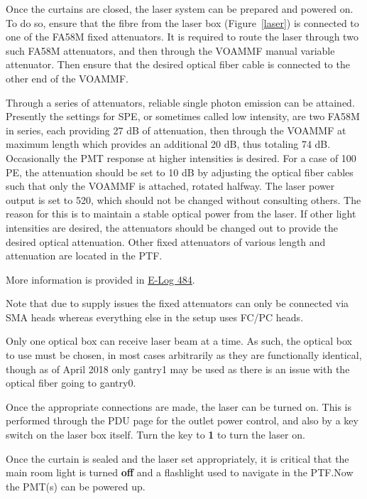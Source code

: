 \documentclass[twoside,letterpaper]{refart}
\begin{document}
Once the curtains are closed, the laser system can be prepared and powered on. To do so, ensure that the fibre from the laser box (Figure~\ref{laser}) is connected to one of the FA58M fixed attenuators. It is required to route the laser through two such FA58M attenuators, and then through the VOAMMF manual variable attenuator. Then ensure that the desired optical fiber cable is connected to the other end of the VOAMMF.

Through a series of attenuators, reliable single photon emission can be attained. Presently the settings for SPE, or sometimes called low intensity, are two FA58M in series, each providing 27 dB of attenuation, then through the VOAMMF at maximum length which provides an additional 20 dB, thus totaling 74 dB. Occasionally the PMT response at higher intensities is desired. For a case of 100 PE, the attenuation should be set to 10 dB by adjusting the optical fiber cables such that only the VOAMMF is attached, rotated halfway. The laser power output is set to 520, which should not be changed without consulting others. The reason for this is to maintain a stable optical power from the laser. If other light intensities are desired, the attenuators should be changed out to provide the desired optical attenuation. Other fixed attenuators of various length and attenuation are located in the PTF.

More information is provided in \href{https://midptf01.triumf.ca/elog/PTF/484}{E-Log 484}.

Note that due to supply issues the fixed attenuators can only be connected via SMA heads whereas everything else in the setup uses FC/PC heads.

Only one optical box can receive laser beam at a time. As such, the optical box to use must be chosen, in most cases arbitrarily as they are functionally identical, though as of April 2018 only gantry1 may be used as there is an issue with the optical fiber going to gantry0.

Once the appropriate connections are made, the laser can be turned on. This is performed through the PDU page for the outlet power control, and also by a key switch on the laser box itself. Turn the key to \textbf{1} to turn the laser on.

Once the curtain is sealed and the laser set appropriately, it is critical that the main room light is turned \textbf{off} and a flashlight used to navigate in the PTF.\@ Now the PMT(s) can be powered up.

\clearpage
\end{document}
